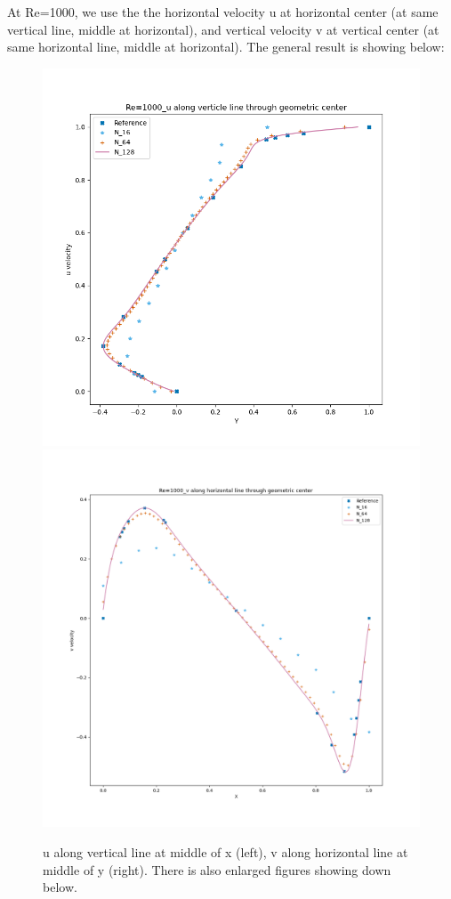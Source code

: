 \documentclass[12pt]{article}
\begin{document}
At Re=1000, we use the the horizontal velocity u at horizontal center (at same vertical line, middle at horizontal), and vertical velocity v at vertical center (at same horizontal line, middle at horizontal). The general result is showing below:

\begin{figure}[H]
    \centering
    \includegraphics[width=0.5\linewidth]{figures/Re=1000_u along verticle line through geometric center.png}
    \hspace{-8mm} %
    \includegraphics[width=0.5\linewidth]{figures/Re=1000_v along horizontal line through geometric center.png }
    \caption{u along vertical line at middle of x (left), v along horizontal line at middle of y (right). There is also enlarged figures showing down below.}
\end{figure}




\end{document}
